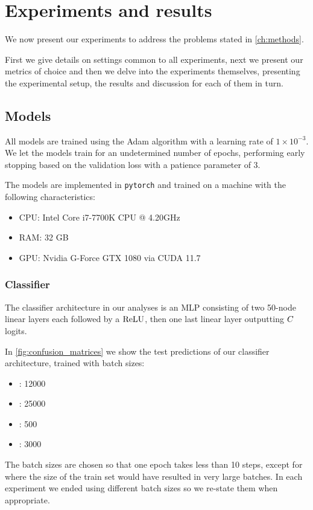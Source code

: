 \documentclass[../main.tex]{subfiles}
\begin{document}
\chapter{Experiments and results}

We now present our experiments to address the problems stated in \autoref{ch:methods}.

First we give details on settings common to all experiments, next we present our metrics of choice
and then we delve into the experiments themselves, presenting the experimental setup, the results and
discussion for each of them in turn.

\section{Models}

All models are trained using the Adam algorithm \cite{kingmaAdam2014} with a learning rate of $1 \times 10^{-3}$.
We let the models train for an undetermined number of epochs, performing early stopping based on the validation loss with a patience parameter of 3.

The models are implemented in \texttt{pytorch} and trained on a machine with the following characteristics:
\begin{itemize}
    \item CPU: Intel Core i7-7700K CPU @ 4.20GHz
    \item RAM: 32 GB
    \item GPU: Nvidia G-Force GTX 1080 via CUDA 11.7
\end{itemize}

\subsection{Classifier}
\label{exp/classifiers}

The classifier architecture in our analyses is an MLP consisting of two 50-node linear layers each followed by a $\text{ReLU}$, then one last linear layer outputting $C$ logits.

In \autoref{fig:confusion_matrices} we show the test predictions of our classifier architecture, trained with batch sizes:
\begin{itemize}
    \item \CakeOnSea: 12000
    \item \ForestCover: 25000
    \item \WineQuality: 500
    \item \OnlineNewsPopularity: 3000
\end{itemize}
The batch sizes are chosen so that one epoch takes less than 10 steps, except for \ForestCover{} where the size of the train set would have resulted in very large batches.
In each experiment we ended using different batch sizes so we re-state them when appropriate.
\end{document}
